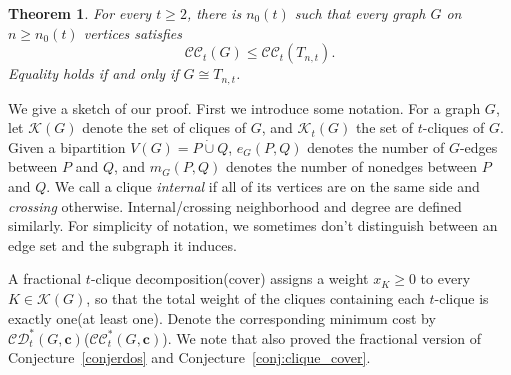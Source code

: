 \documentclass[11pt]{article}
\numberwithin{equation}{section}
\newtheorem{theorem}{Theorem}[section]
\theoremstyle{remark}
\newcommand{\dotcupunion}{\mathbin{\dot\cup}}
\newcommand{\CC}{\mathcal{CC}}
\newcommand{\CCstar}{\mathcal{CC}^{*}}
\newcommand{\CDstar}{\mathcal{CD}^{*}}
\begin{document}
\begin{theorem}\label{cov:thm:main}
  For every $t\ge 2$, there is $n_0(t)$ such that every graph $G$ on $n\ge n_0(t)$ vertices satisfies
\begin{equation*}
\CC_t(G)\le \CC_t(T_{n,t}).
\end{equation*}
Equality holds if and only if \(G\cong T_{n,t}\).
\end{theorem}

We give a sketch of our proof. First we introduce some notation. For a graph \(G\),
let \(\mathcal{K} (G)\) denote the set of cliques of \(G\), and \(\mathcal{K}_t (G)\) the set of \(t\)-cliques of \(G\).
Given a bipartition \(V(G)=P\dotcupunion Q\), \(e_G(P,Q)\) denotes the number of \(G\)-edges between \(P\) and \(Q\),
and \(m_G(P,Q)\) denotes the number of nonedges between \(P\) and \(Q\).
We call a clique \emph{internal} if all of its vertices are on the same side and \emph{crossing} otherwise.
Internal/crossing neighborhood and degree are defined similarly.
For simplicity of notation, we sometimes don't distinguish between an edge set and the subgraph it induces.

A fractional \(t\)-clique decomposition(cover) assigns a weight \(x_K\ge 0\) to every
\(K\in\mathcal K(G)\), so that the total weight of the cliques containing
each \(t\)-clique is exactly one(at least one). Denote the corresponding minimum cost
by \(\CDstar_t(G,\mathbf c)\)(\(\CCstar_t(G,\mathbf c)\)). We note that \cite{BHKNW} also
proved the fractional version of Conjecture~\ref{conjerdos} and Conjecture~\ref{conj:clique_cover}.
\end{document}
